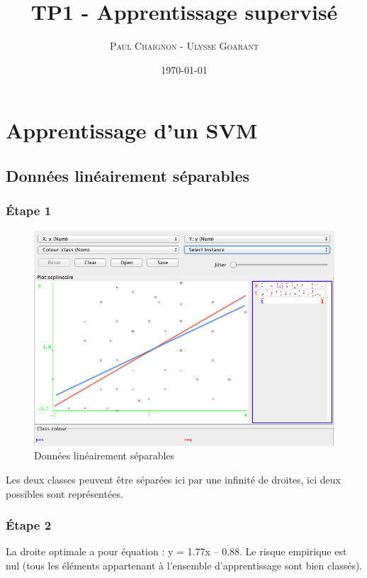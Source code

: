 \documentclass[a4paper,12pt]{article}
\title{TP1 - Apprentissage supervisé}
\author{\textsc{Paul Chaignon} - \textsc{Ulysse Goarant}}
\date{\today}
\begin{document}
\maketitle

\section{Apprentissage d'un SVM}

\subsection{Données linéairement séparables}

\subsubsection*{\'Etape 1}
\begin{figure}
	\center
	\includegraphics[width=1\textwidth]{SVM-graphe.png}
	\caption{Données linéairement séparables}
	\label{fig:svm-graphe}
\end{figure}
Les deux classes peuvent être séparées ici par une infinité de droites, ici deux possibles sont représentées.

\subsubsection*{\'Etape 2}
La droite optimale a pour équation : y = 1.77x – 0.88.
Le risque empirique est nul (tous les éléments appartenant à l’ensemble d’apprentissage sont bien classés).
\end{document}
